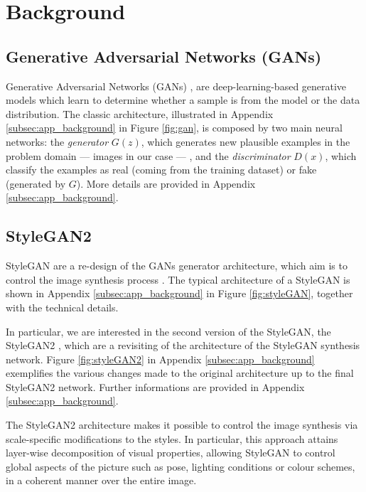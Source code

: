 \documentclass{article}
\begin{document}
	\section{Background}	
	
	\subsection{Generative Adversarial Networks (GANs)}\label{sec:gan}
	Generative Adversarial Networks (GANs) \cite{goodfellow2014generative}, are deep-learning-based 
	generative models which learn to determine whether a sample is from the model or the data 
	distribution. 
	The classic architecture, illustrated in Appendix \ref{subsec:app_background} in Figure 
	\ref{fig:gan}, is 
	composed by two main neural networks: 
	the \textit{generator} ${G(z)}$, which generates new plausible examples in the problem domain — 
	images in our case — , and the \textit{discriminator} ${D(x)}$, which classify the examples as 
	real (coming from the training dataset) or fake (generated by $G$). More details are provided in 
	Appendix \ref{subsec:app_background}.
	
	\subsection{StyleGAN2}\label{sec:stylegan}
	StyleGAN are a re-design of the GANs generator architecture, which aim is to control the image 
	synthesis process \cite{karras2019style}. The typical architecture of a StyleGAN is shown in 
	Appendix \ref{subsec:app_background} in Figure \ref{fig:styleGAN}, together with the technical 
	details. 
	
	In particular, we are interested in the second version of the StyleGAN, the StyleGAN2 
	\cite{karras2020analyzing}, which are a revisiting of the architecture of the StyleGAN synthesis 
	network. Figure \ref{fig:styleGAN2} in Appendix \ref{subsec:app_background} exemplifies the 
	various changes made to the original architecture up to the final StyleGAN2 network. Further 
	informations are provided in Appendix \ref{subsec:app_background}.
	 
	The StyleGAN2 architecture makes it possible to control the image synthesis via scale-specific 
	modifications to the styles. In particular, this approach attains layer-wise decomposition of visual 
	properties, allowing StyleGAN to control global aspects of the picture such as pose, lighting 
	conditions or colour schemes, in a coherent manner over the entire image.
	
\end{document}
